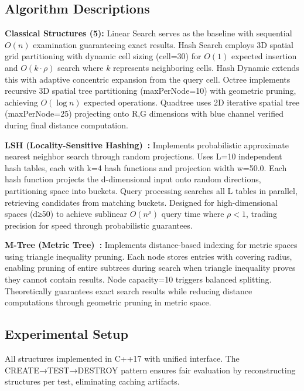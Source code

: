 \documentclass{sbc2023}
\begin{document}
\subsection{Algorithm Descriptions}

\textbf{Classical Structures (5):} Linear Search serves as the baseline with sequential $O(n)$ examination guaranteeing exact results. Hash Search employs 3D spatial grid partitioning with dynamic cell sizing (cell=30) for $O(1)$ expected insertion and $O(k \cdot \rho)$ search where $k$ represents neighboring cells. Hash Dynamic extends this with adaptive concentric expansion from the query cell. Octree implements recursive 3D spatial tree partitioning (maxPerNode=10) with geometric pruning, achieving $O(\log n)$ expected operations. Quadtree uses 2D iterative spatial tree (maxPerNode=25) projecting onto R,G dimensions with blue channel verified during final distance computation.

\textbf{LSH (Locality-Sensitive Hashing)~\cite{indyk1998approximate}:} Implements probabilistic approximate nearest neighbor search through random projections. Uses L=10 independent hash tables, each with k=4 hash functions and projection width w=50.0. Each hash function projects the d-dimensional input onto random directions, partitioning space into buckets. Query processing searches all L tables in parallel, retrieving candidates from matching buckets. Designed for high-dimensional spaces (d≥50) to achieve sublinear $O(n^\rho)$ query time where $\rho < 1$, trading precision for speed through probabilistic guarantees.

\textbf{M-Tree (Metric Tree)~\cite{ciaccia1997m}:} Implements distance-based indexing for metric spaces using triangle inequality pruning. Each node stores entries with covering radius, enabling pruning of entire subtrees during search when triangle inequality proves they cannot contain results. Node capacity=10 triggers balanced splitting. Theoretically guarantees exact search results while reducing distance computations through geometric pruning in metric space.

\subsection{Experimental Setup}

All structures implemented in C++17 with unified interface. The CREATE→TEST→DESTROY pattern ensures fair evaluation by reconstructing structures per test, eliminating caching artifacts.
\end{document}
